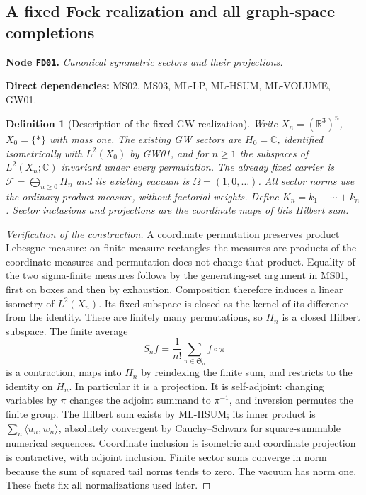 \documentclass[11pt,a4paper]{article}
\newtheorem{definition}[theorem]{Definition}
\theoremstyle{remark}\newtheorem{remark}[theorem]{Remark}
\newcommand{\R}{\mathbb R}\newcommand{\C}{\mathbb C}\newcommand{\N}{\mathbb N}
\newcommand{\F}{\mathcal F}\newcommand{\Q}{\mathcal Q}\newcommand{\HH}{\mathcal H}
\newcommand{\node}[3]{\par\Needspace{6\baselineskip}\smallskip\hypertarget{node:#1}{}\label{nodepage:#1}\noindent\textbf{Node \texttt{#1}.} \textit{#2.}\par\noindent\textbf{Direct dependencies:} #3.\par}
\begin{document}
\subsection{A fixed Fock realization and all graph-space completions}
\node{FD01}{Canonical symmetric sectors and their projections}{MS02, MS03, ML-LP, ML-HSUM, ML-VOLUME, GW01}
\begin{definition}[Description of the fixed GW realization]\label{def:canonicalFock}
Write $X_n=(\R^3)^n$, $X_0=\{\ast\}$ with mass one. The existing GW sectors are $H_0=\C$, identified isometrically with $L^2(X_0)$ by GW01, and for $n\geq1$ the subspaces of $L^2(X_n;\C)$ invariant under every permutation. The already fixed carrier is $\F=\bigoplus_{n\geq0}H_n$ and its existing vacuum is $\Omega=(1,0,\ldots)$. All sector norms use the ordinary product measure, without factorial weights. Define $K_n=k_1+\cdots+k_n$. Sector inclusions and projections are the coordinate maps of this Hilbert sum.
\end{definition}
\begin{proof}[Verification of the construction]
A coordinate permutation preserves product Lebesgue measure: on finite-measure rectangles the measures are products of the coordinate measures and permutation does not change that product. Equality of the two sigma-finite measures follows by the generating-set argument in MS01, first on boxes and then by exhaustion. Composition therefore induces a linear isometry of $L^2(X_n)$. Its fixed subspace is closed as the kernel of its difference from the identity. There are finitely many permutations, so $H_n$ is a closed Hilbert subspace. The finite average
\[
 S_nf=\frac1{n!}\sum_{\pi\in\mathfrak S_n}f\circ\pi
\]
is a contraction, maps into $H_n$ by reindexing the finite sum, and restricts to the identity on $H_n$. In particular it is a projection. It is self-adjoint: changing variables by $\pi$ changes the adjoint summand to $\pi^{-1}$, and inversion permutes the finite group. The Hilbert sum exists by ML-HSUM; its inner product is $\sum_n\langle u_n,w_n\rangle$, absolutely convergent by Cauchy--Schwarz for square-summable numerical sequences. Coordinate inclusion is isometric and coordinate projection is contractive, with adjoint inclusion. Finite sector sums converge in norm because the sum of squared tail norms tends to zero. The vacuum has norm one. These facts fix all normalizations used later.
\end{proof}
\end{document}
